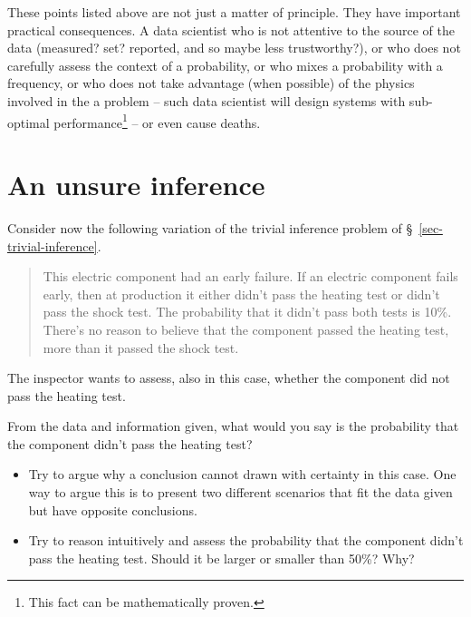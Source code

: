\documentclass[
  a4paper,
  DIV=11,
  numbers=noendperiod,
  oneside]{scrreprt}
\providecommand{\tightlist}{%
  \setlength{\itemsep}{0pt}\setlength{\parskip}{0pt}}\usepackage{longtable,booktabs,array}
\begin{document}
\hfill\break

These points listed above are not just a matter of principle. They have
important practical consequences. A data scientist who is not attentive
to the source of the data (measured? set? reported, and so maybe less
trustworthy?), or who does not carefully assess the context of a
probability, or who mixes a probability with a frequency, or who does
not take advantage (when possible) of the physics involved in the a
problem -- such data scientist will design systems with sub-optimal
performance\footnote{This fact can be mathematically proven.} -- or even
cause deaths.

\hypertarget{sec-uncertain-inference}{%
\section{An unsure inference}\label{sec-uncertain-inference}}

Consider now the following variation of the trivial inference problem of
§~\ref{sec-trivial-inference}.

\begin{quote}
This electric component had an early failure. If an electric component
fails early, then at production it either didn't pass the heating test
or didn't pass the shock test. The probability that it didn't pass both
tests is 10\%. There's no reason to believe that the component passed
the heating test, more than it passed the shock test.
\end{quote}

The inspector wants to assess, also in this case, whether the component
did not pass the heating test.

From the data and information given, what would you say is the
probability that the component didn't pass the heating test?

\begin{tcolorbox}[enhanced jigsaw, titlerule=0mm, opacitybacktitle=0.6, toprule=.15mm, toptitle=1mm, opacityback=0, left=2mm, colframe=quarto-callout-caution-color-frame, arc=.35mm, bottomtitle=1mm, leftrule=.75mm, colbacktitle=quarto-callout-caution-color!10!white, coltitle=black, title={\faIcon{user-edit} Exercises}, rightrule=.15mm, breakable, colback=white, bottomrule=.15mm]

\begin{itemize}
\tightlist
\item
  Try to argue why a conclusion cannot drawn with certainty in this
  case. One way to argue this is to present two different scenarios that
  fit the data given but have opposite conclusions.
\item
  Try to reason intuitively and assess the probability that the
  component didn't pass the heating test. Should it be larger or smaller
  than 50\%? Why?
\end{itemize}

\end{tcolorbox}
\end{document}
